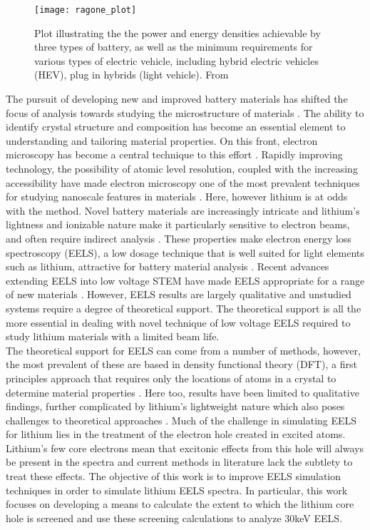 \begin{figure}
	\centering
	\texttt{[image: ragone\_plot]}
	\caption{Plot illustrating the the power and energy densities achievable by three types of battery, as well as the minimum requirements for various types of electric vehicle, including hybrid electric vehicles (HEV), plug in hybrids (light vehicle). From \cite{etacheri_challenges_2011} }
	\label{ragone}
	
\end{figure}
The pursuit of developing new and improved battery materials has shifted the focus of analysis towards studying the microstructure of materials \cite{lu_lithium_2012,arthur_spontaneous_2016, muller_quantification_2018}. The ability to identify crystal structure and composition has become an essential element to understanding and tailoring material properties.  On this front, electron microscopy has become a central technique to this effort  \cite{chiu_aqueous_2013,inkson_2_2016}.  Rapidly improving technology, the possibility of atomic level resolution, coupled with the increasing accessibility have made electron microscopy one of the most prevalent techniques for studying nanoscale features in materials \cite{hansen_atomic-resolution_2001}.  Here, however lithium is at odds with the method.  Novel battery materials are increasingly intricate and lithium's lightness and ionizable nature make it particularly sensitive to electron beams, and often require indirect analysis \cite{kobayashi_quantitative_2017}.  These properties make electron energy loss spectroscopy (EELS), a low dosage technique that is well suited for light elements such as lithium, attractive for battery material analysis  \cite{Egerton}. Recent advances extending EELS into low voltage STEM have made EELS appropriate for a range of new materials \cite{SU_9000}.  However, EELS results are largely qualitative and unstudied systems require a degree of theoretical support.  The theoretical support is all the more essential in dealing with novel technique of low voltage EELS required to study lithium materials with a limited beam life.    
\\
The theoretical support for EELS can come from a number of methods, however, the most prevalent of these are based in density functional theory (DFT), a first principles approach that requires only the locations of atoms in a crystal to determine material properties \cite{ks_1965, wien2k,elk,exciting}.  Here too, results have been limited to qualitative findings, further complicated by lithium's lightweight nature which also poses challenges to theoretical approaches \cite{mauchamp_ab_2006, mauchamp_local_2008}. Much of the challenge in simulating EELS for lithium lies in the treatment of the electron hole created in excited atoms.  Lithium's few core electrons mean that excitonic effects from this hole will always be present in the spectra and current methods in literature lack the subtlety to treat these effects.  The objective of this work is to improve  EELS simulation techniques in order to simulate lithium EELS spectra.  In particular, this work focuses on developing a means to calculate the extent to which the lithium core hole is screened and use these screening calculations to analyze 30keV EELS.  

